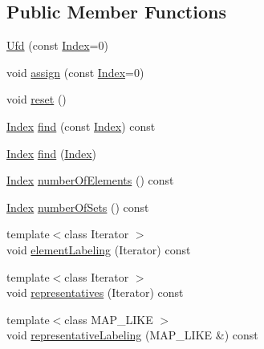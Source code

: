 \subsection*{Public Member Functions}
\begin{DoxyCompactItemize}
\item 
\hyperlink{classnifty_1_1ufd_1_1Ufd_aab82fff1e159408a465bee8547f67358}{Ufd} (const \hyperlink{classnifty_1_1ufd_1_1Ufd_a0a9a7ab02b6d77fb2035234cbda8b3a7}{Index}=0)
\item 
void \hyperlink{classnifty_1_1ufd_1_1Ufd_a9a6de315835c32c6c9ef80603e36cb41}{assign} (const \hyperlink{classnifty_1_1ufd_1_1Ufd_a0a9a7ab02b6d77fb2035234cbda8b3a7}{Index}=0)
\item 
void \hyperlink{classnifty_1_1ufd_1_1Ufd_ab88f28136d563c4605960bf9aef2d86f}{reset} ()
\item 
\hyperlink{classnifty_1_1ufd_1_1Ufd_a0a9a7ab02b6d77fb2035234cbda8b3a7}{Index} \hyperlink{classnifty_1_1ufd_1_1Ufd_a49d6eaabe5012f1aa5432eaabb419f38}{find} (const \hyperlink{classnifty_1_1ufd_1_1Ufd_a0a9a7ab02b6d77fb2035234cbda8b3a7}{Index}) const 
\item 
\hyperlink{classnifty_1_1ufd_1_1Ufd_a0a9a7ab02b6d77fb2035234cbda8b3a7}{Index} \hyperlink{classnifty_1_1ufd_1_1Ufd_ad8527c71f15c6ecda301cd96fa391f35}{find} (\hyperlink{classnifty_1_1ufd_1_1Ufd_a0a9a7ab02b6d77fb2035234cbda8b3a7}{Index})
\item 
\hyperlink{classnifty_1_1ufd_1_1Ufd_a0a9a7ab02b6d77fb2035234cbda8b3a7}{Index} \hyperlink{classnifty_1_1ufd_1_1Ufd_a5f4fab696625e0032827061a7ebbbba0}{number\+Of\+Elements} () const 
\item 
\hyperlink{classnifty_1_1ufd_1_1Ufd_a0a9a7ab02b6d77fb2035234cbda8b3a7}{Index} \hyperlink{classnifty_1_1ufd_1_1Ufd_acdde0f3dc1d98fa6545f9f47d831eee5}{number\+Of\+Sets} () const 
\item 
{\footnotesize template$<$class Iterator $>$ }\\void \hyperlink{classnifty_1_1ufd_1_1Ufd_a88a65fcb7ab87fd7376293bfce8d603d}{element\+Labeling} (Iterator) const 
\item 
{\footnotesize template$<$class Iterator $>$ }\\void \hyperlink{classnifty_1_1ufd_1_1Ufd_a4d555a5467757c9f65f9676e5c69f490}{representatives} (Iterator) const 
\item 
{\footnotesize template$<$class M\+A\+P\+\_\+\+L\+I\+K\+E $>$ }\\void \hyperlink{classnifty_1_1ufd_1_1Ufd_a027787aef150f1b6d9179c42a1ab9940}{representative\+Labeling} (M\+A\+P\+\_\+\+L\+I\+K\+E \&) const 

\end{DoxyCompactItemize}
